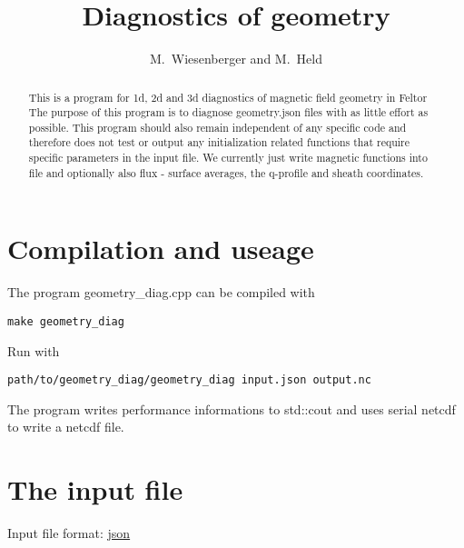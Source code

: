 


\usepackage{minted}
\renewcommand{\ne}{\ensuremath{{n_e} }}
\renewcommand{\ni}{\ensuremath{{N_i} }}



\title{Diagnostics of geometry}
\author{ M.~Wiesenberger and M.~Held}
\maketitle

\begin{abstract}
  This is a program for 1d, 2d and 3d diagnostics of magnetic field geometry in
  Feltor The purpose of this program is to diagnose geometry.json files with as
  little effort as possible. This program should also remain independent of any
  specific code and therefore does not test or output any initialization
  related functions that require specific parameters in the input file.  We
  currently just write magnetic functions into file and optionally also flux -
  surface averages, the q-profile and sheath coordinates.
\end{abstract}
\tableofcontents

\section{Compilation and useage}
The program geometry\_diag.cpp can be compiled with
\begin{verbatim}
make geometry_diag
\end{verbatim}
Run with
\begin{verbatim}
path/to/geometry_diag/geometry_diag input.json output.nc
\end{verbatim}
The program writes performance informations to std::cout and uses serial netcdf to write a netcdf file.

\section{The input file}
Input file format: \href{https://en.wikipedia.org/wiki/JSON}{json}

